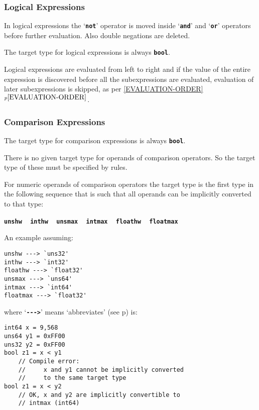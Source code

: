 \documentclass[12pt]{article}
\newcommand{\TT}[1]{{\tt \bfseries #1}}
\newcommand{\itemref}[1]{\ref{#1}$^{p\pageref{#1}}$}
\newcommand{\pagref}[1]{p\pageref{#1}}
\newenvironment{indpar}[1][0.3in]%
	{\begin{list}{}%
		     {\setlength{\itemsep}{0in}%
		      \setlength{\topsep}{0in}%
		      \setlength{\parsep}{1ex}%
		      \setlength{\labelwidth}{#1}%
		      \setlength{\leftmargin}{#1}%
		      \addtolength{\leftmargin}{\labelsep}}%
	 \item}%
	{\end{list}}
\begin{document}
\subsubsection{Logical Expressions}

In logical expressions the `\TT{not}' operator is moved inside
`\TT{and}' and `\TT{or}' operators before further evaluation.
Also double negations are deleted.

The target type for logical expressions is always \TT{bool}.

Logical expressions are evaluated from left to right and
if the value of the entire expression is discovered before all
the subexpressions are evaluated, evaluation of later subexpressions is
skipped, as per \itemref{EVALUATION-ORDER}.

\subsubsection{Comparison Expressions}
\label{COMPARISON-EXPRESSIONS}

The target type for comparison expressions is always \TT{bool}.

There is no given target type for operands of comparison operators.
So the target type of these must be specified by rules.

For numeric operands of comparison operators
the target type is the first type
in the following sequence that is such that all operands
can be implicitly converted to that type:
\begin{center}
\TT{unshw} ~ \TT{inthw} ~ \TT{unsmax} ~ \TT{intmax}
           ~ \TT{floathw} ~ \TT{floatmax}
\end{center}

An example assuming:


\begin{indpar}\begin{verbatim}
unshw ---> `uns32'
inthw ---> `int32'
floathw ---> `float32'
unsmax ---> `uns64'
intmax ---> `int64'
floatmax ---> `float32'
\end{verbatim}\end{indpar}

where `\TT{-{}-{}->}' means `abbreviates'
(see \pagref{ABBREVIATION-DECLARATION}) is: 

\begin{indpar}\begin{verbatim}
int64 x = 9,568
uns64 y1 = 0xFF00
uns32 y2 = 0xFF00
bool z1 = x < y1
    // Compile error:
    //     x and y1 cannot be implicitly converted
    //     to the same target type
bool z1 = x < y2
    // OK, x and y2 are implicitly convertible to
    // intmax (int64)
\end{verbatim}\end{indpar}
\end{document}
